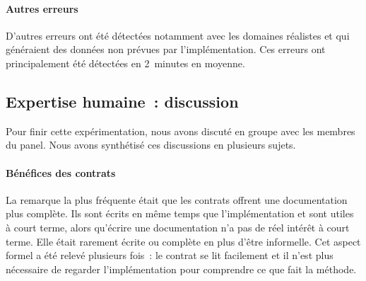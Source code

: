 \paragraph{Autres erreurs} D'autres erreurs ont été détectées notamment avec les
domaines réalistes  et  qui généraient des données non
prévues par l'implémentation. Ces erreurs ont principalement été détectées en
2~minutes en moyenne.

\subsection{Expertise humaine~: discussion}
\label{subsection:experimentation:discuss}

%
%
%
%
%

Pour finir cette expérimentation, nous avons discuté en groupe avec les membres
du panel. Nous avons synthétisé ces discussions en plusieurs sujets.

\paragraph{Bénéfices des contrats} La remarque la plus fréquente était que les
con\-trats offrent une documentation plus complète. Ils sont écrits en même
temps que l'implémentation et sont utiles à court terme, alors qu'écrire une
documentation n'a pas de réel intérêt à court terme. Elle était rarement
écrite ou complète en plus d'être informelle. Cet aspect formel a été relevé
plusieurs fois~: le contrat se lit facilement et il n'est plus nécessaire de
regarder l'implémentation pour comprendre ce que fait la méthode.

